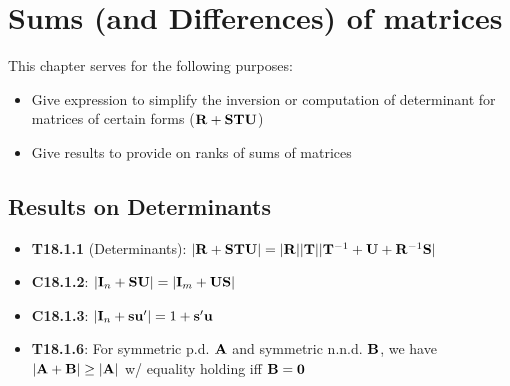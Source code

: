 \documentclass[a4paper, oneside]{book}
\begin{document}
\chapter{Sums (and Differences) of matrices}


This chapter serves for the following purposes:

\begin{itemize}
\item Give expression to simplify the inversion or computation of determinant for matrices of certain forms (\eg $\mathbf{R+STU}$)
\item Give results to provide on ranks of sums of matrices
\end{itemize}


\section{Results on Determinants}
\begin{itemize}
\item \textbf{T18.1.1} (Determinants): $|\mathbf{R+STU} | = |\mathbf R| |\mathbf T| |\mathbf T^{-1} + \mathbf U + \mathbf R^{-1} \mathbf S| $
\item \textbf{C18.1.2}: $|\mathbf{I}_n + \mathbf{SU}| = |\mathbf I_m + \mathbf{US}|$
\item \textbf{C18.1.3}: $|\mathbf I_n + \mathbf{su}'| = 1+\mathbf{s'u}$
\item \textbf{T18.1.6}: For symmetric p.d. $\mathbf A$ and symmetric n.n.d. $\mathbf B$, we have $|\mathbf{A+B}| \ge |\mathbf A|$ w/ equality holding iff $\mathbf B=\mathbf 0$
\end{itemize}
\end{document}
